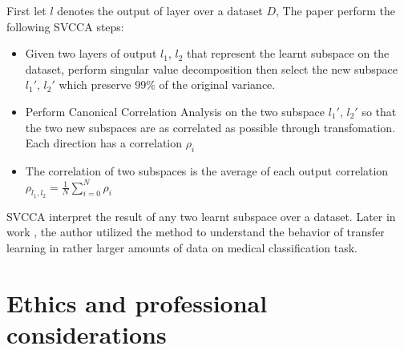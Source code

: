 First let $l$ denotes the output of layer over a dataset $D$, The paper perform the following SVCCA steps:
\begin{itemize}
	\item Given two layers of output $l_{1}$, $l_{2}$ that represent the learnt subspace on the dataset, perform singular value decomposition then select the new subspace $l_{1}'$, $l_{2}'$ which preserve 99\% of the original variance.
	\item Perform Canonical Correlation Analysis on the two subspace $l_{1}'$, $l_{2}'$ so that the two new subspaces are as correlated as possible through transfomation. Each direction has a correlation $\rho_{i}$
	\item The correlation of two subspaces is the average of each output correlation $\rho_{l_{1}, l_{2}} = \frac{1}{N}\sum_{i=0}^{N} \rho_{i}$
\end{itemize}

SVCCA interpret the result of any two learnt subspace over a dataset. Later in work \cite{raghu_transfusion_2019}, the author utilized the method to understand the behavior of transfer learning in rather larger amounts of data on medical classification task.\\
\newpage
\section{Ethics and professional considerations}
\newpage